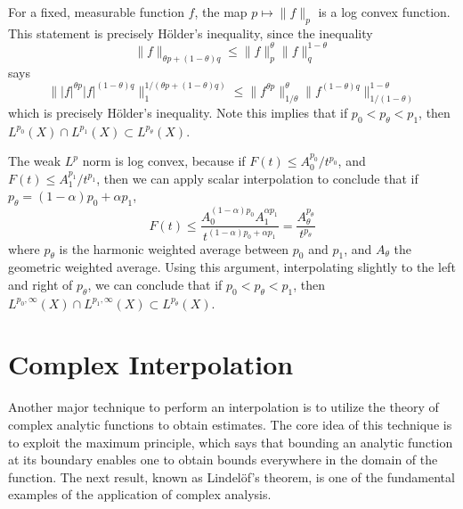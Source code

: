 \begin{example}
    For a fixed, measurable function $f$, the map $p \mapsto \| f \|_p$ is a log convex function. This statement is precisely H\"{o}lder's inequality, since the inequality
    \[ \| f \|_{\theta p + (1 - \theta) q} \leq \| f \|_p^\theta \| f \|_{q}^{1-\theta} \]
    says
    \[ \| |f|^{\theta p} |f|^{(1 - \theta) q} \|_1^{1/(\theta p + (1 - \theta) q)} \leq \| f^{\theta p} \|_{1/\theta}^{\theta} \| f^{(1-\theta)q} \|_{1/(1-\theta)}^{1-\theta} \]
    which is precisely H\"{o}lder's inequality. Note this implies that if $p_0 < p_\theta < p_1$, then $L^{p_0}(X) \cap L^{p_1}(X) \subset L^{p_\theta}(X)$.
\end{example}

\begin{example}
    The weak $L^p$ norm is log convex, because if $F(t) \leq A_0^{p_0}/t^{p_0}$, and $F(t) \leq A_1^{p_1}/t^{p_1}$, then we can apply scalar interpolation to conclude that if $p_\theta = (1 - \alpha) p_0 + \alpha p_1$,
    \[ F(t) \leq \frac{A_0^{(1 - \alpha) p_0}A_1^{\alpha p_1}}{t^{(1 - \alpha)p_0 + \alpha p_1}} = \frac{A_\theta^{p_\theta}}{t^{p_\theta}} \]
    where $p_\theta$ is the harmonic weighted average between $p_0$ and $p_1$, and $A_\theta$ the geometric weighted average. Using this argument, interpolating slightly to the left and right of $p_\theta$, we can conclude that if $p_0 < p_\theta < p_1$, then $L^{p_0,\infty}(X) \cap L^{p_1,\infty}(X) \subset L^{p_\theta}(X)$.
\end{example}

\section{Complex Interpolation}

Another major technique to perform an interpolation is to utilize the theory of complex analytic functions to obtain estimates. The core idea of this technique is to exploit the maximum principle, which says that bounding an analytic function at its boundary enables one to obtain bounds everywhere in the domain of the function. The next result, known as Lindel\"{o}f's theorem, is one of the fundamental examples of the application of complex analysis.

